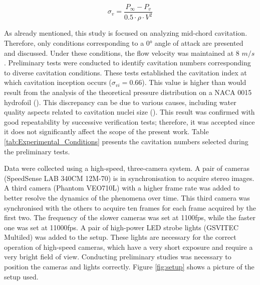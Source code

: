 \begin{equation}
    \label{cavitation_number}
        \sigma_v = \frac{P_\infty - P_v}{0.5 \cdot \rho \cdot V^2}
\end{equation}

As already mentioned, this study is focused on analyzing mid-chord cavitation. Therefore, only conditions corresponding to a 0° angle of attack are presented and discussed. Under these conditions, the flow velocity was maintained at 8 $m/s$.  
Preliminary tests were conducted to identify cavitation numbers corresponding to diverse cavitation conditions. These tests established the cavitation index at which cavitation inception occurs ($\sigma_{vi} = 0.66$). This value is higher than would result from the analysis of the theoretical pressure distribution on a NACA 0015 hydrofoil (\cite{Abbott1945}).
This discrepancy can be due to various causes, including water quality aspects related to cavitation nuclei size (\cite{franc2006fundamentals}). 
This result was confirmed with good repeatability by successive verification tests; therefore, it was accepted since it does not significantly affect the scope of the present work. Table \ref{tab:Experimental_Conditions} presents the cavitation numbers selected during the preliminary tests.

\begin{center}
\end{center}

Data were collected using a high-speed, three-camera system. A pair of cameras (SpeedSense LAB 340CM 12M-70) is in synchronisation to acquire stereo images. A third camera (Phantom VEO710L) with a higher frame rate was added to better resolve the dynamics of the phenomena over time. This third camera was synchronised with the others to acquire ten frames for each frame acquired by the first two. 
The frequency of the slower cameras was set at 1100fps, while the faster one was set at 11000fps.
A pair of high-power LED strobe lights (GSVITEC Multiled) was added to the setup. These lights are necessary for the correct operation of high-speed cameras, which have a very short exposure and require a very bright field of view.
Conducting preliminary studies was necessary to position the cameras and lights correctly. 
Figure \ref{fig:setup} shows a picture of the setup used.

